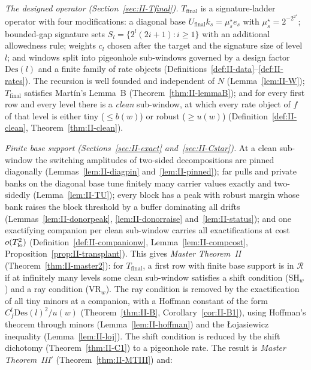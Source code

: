 \documentclass[10pt]{amsart}
\theoremstyle{definition}
\theoremstyle{remark}
\newcommand{\Rec}{\mathcal R}
\begin{document}
\emph{The designed operator (Section~\ref{sec:II-Tfinal}).}
$T_{\mathrm{final}}$ is a signature-ladder operator with four
modifications: a diagonal base $U_{\mathrm{final}}k_s=\mu^\star_se_s$ with
$\mu^\star_s=2^{-2^{2^s}}$; bounded-gap signature sets
$S_l=\{2^l(2i+1):i\ge1\}$ with an additional allowedness rule; weights
$c_l$ chosen after the target and the signature size of level $l$; and
windows split into pigeonhole sub-windows governed by a design factor
$\mathrm{Des}(l)$ and a finite family of rate objects
(Definitions~\ref{def:II-data}--\ref{def:II-rates}).  The recursion is well
founded and independent of $N$ (Lemma~\ref{lem:II-W}); $T_{\mathrm{final}}$
satisfies Mart\'in's Lemma~B (Theorem~\ref{thm:II-lemmaB}); and for every
first row and every level there is a \emph{clean} sub-window, at which every
rate object of $f$ of that level is either tiny ($\le b(w)$) or robust
($\ge u(w)$) (Definition~\ref{def:II-clean}, Theorem~\ref{thm:II-clean}).

\emph{Finite base support (Sections~\ref{sec:II-exact}
and~\ref{sec:II-Cstar}).}  At a clean sub-window the switching amplitudes
of two-sided decompositions are pinned diagonally (Lemmas~\ref{lem:II-diagpin}
and~\ref{lem:II-pinned}); far pulls and private banks on the diagonal base
tune finitely many carrier values exactly and two-sidedly
(Lemma~\ref{lem:II-TU}); every block has a peak with robust margin whose
bank raises the block threshold by a buffer dominating all drifts
(Lemmas~\ref{lem:II-donorpeak}, \ref{lem:II-donorraise}
and~\ref{lem:II-status}); and one exactifying companion per clean
sub-window carries all exactifications at cost $o(T_{\rm lo}^2)$
(Definition~\ref{def:II-companionw}, Lemma~\ref{lem:II-compcost},
Proposition~\ref{prop:II-transplant}).  This gives \emph{Master
Theorem~II} (Theorem~\ref{thm:II-master2}): for $T_{\mathrm{final}}$, a
first row with finite base support is in $\Rec$ if at infinitely many
levels some clean sub-window satisfies a shift condition (SH$_w$) and a ray
condition (VR$_w$).  The ray condition is removed by the exactification
of all tiny minors at a companion, with a Hoffman constant of the form
$C_f^l\mathrm{Des}(l)^2/u(w)$ (Theorem~\ref{thm:II-B},
Corollary~\ref{cor:II-B1}), using Hoffman's theorem \cite{Hoffman} through
minors (Lemma~\ref{lem:II-hoffman}) and the {\L}ojasiewicz inequality
\cite{BCR} (Lemma~\ref{lem:II-loj}).  The shift condition is reduced by the
shift dichotomy (Theorem~\ref{thm:II-C1}) to a pigeonhole rate.  The
result is \emph{Master Theorem~III$'$} (Theorem~\ref{thm:II-MTIII}) and:
\end{document}
